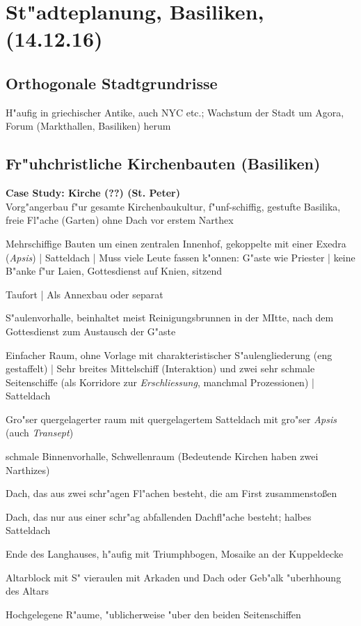 \documentclass[emulatestandardclasses]{scrartcl}
\begin{document}
\section{St"adteplanung, Basiliken, \\(14.12.16)}

\subsection{Orthogonale Stadtgrundrisse}

H"aufig in griechischer Antike, auch NYC etc.; Wachstum der Stadt um Agora, Forum (Markthallen, Basiliken) herum


\subsection{Fr"uhchristliche Kirchenbauten (Basiliken)}

\noindent\textbf{Case Study: Kirche (??) (St. Peter)}\\
Vorg"angerbau f"ur gesamte Kirchenbaukultur, f"unf-schiffig, gestufte Basilika, freie Fl"ache (Garten) ohne Dach vor erstem Narthex


\begin{description}[leftmargin=!,labelwidth=\widthof{\bfseries Baptisterium}]
  \item[Basilika] Mehrschiffige Bauten um einen zentralen Innenhof, gekoppelte mit einer Exedra (\emph{Apsis}) | Satteldach | Muss viele Leute fassen k"onnen: G"aste wie Priester | keine B"anke f"ur Laien, Gottesdienst auf Knien, sitzend 
  \item[Baptisterium] Taufort | Als Annexbau oder separat
  \item[Atrium] S"aulenvorhalle, beinhaltet meist Reinigungsbrunnen in der MItte, nach dem Gottesdienst zum Austausch der G"aste
  \item[Langhaus] Einfacher Raum, ohne Vorlage mit charakteristischer S"aulengliederung (eng gestaffelt) | Sehr breites Mittelschiff (Interaktion) und zwei sehr schmale Seitenschiffe (als Korridore zur \emph{Erschliessung}, manchmal Prozessionen) | Satteldach
  \item[Querhaus] Gro"ser quergelagerter raum mit quergelagertem Satteldach mit gro"ser \emph{Apsis} (auch \emph{Transept})
  \item[Narthex] schmale Binnenvorhalle, Schwellenraum (Bedeutende Kirchen haben zwei Narthizes)
  \item[Satteldach] Dach, das aus zwei schr"agen Fl"achen besteht, die am First zusammenstoßen
  \item[Pultdach] Dach, das nur aus einer schr"ag abfallenden Dachfl"ache besteht; halbes Satteldach
  \item[Apsis] Ende des Langhauses, h"aufig mit Triumphbogen, Mosaike an der Kuppeldecke
  \item[Ziborium] Altarblock mit S" vieraulen mit Arkaden und Dach oder Geb"alk "uberhhoung des Altars
  \item[Empore] Hochgelegene R"aume, "ublicherweise "uber den beiden Seitenschiffen
\end{description}
\end{document}
